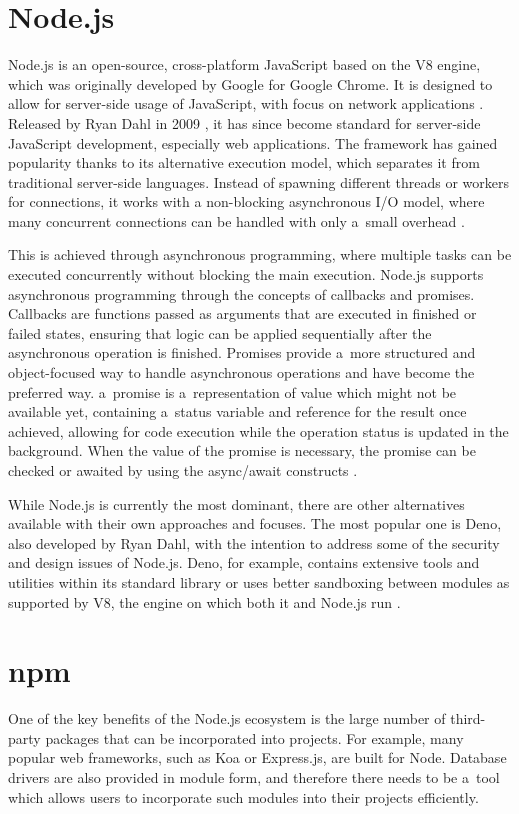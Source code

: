 \section*{Node.js}
Node.js is an open-source, cross-platform JavaScript based on the V8 engine,
which was originally developed by Google for Google Chrome. It is designed to
allow for server-side usage of JavaScript, with focus on network applications
\cite{node-about}. Released by Ryan Dahl in 2009 \cite{ryan-node}, it has since
become standard for server-side JavaScript development, especially web
applications. The framework has gained popularity thanks to its alternative
execution model, which separates it from traditional server-side languages.
Instead of spawning different threads or workers for connections, it works with
a non-blocking asynchronous I/O model, where many concurrent connections can be
handled with only a~small overhead \cite{orsini_2013}.

This is achieved through asynchronous programming, where multiple tasks can be
executed concurrently without blocking the main execution. Node.js supports
asynchronous programming through the concepts of callbacks and promises.
Callbacks are functions passed as arguments that are executed in finished or
failed states, ensuring that logic can be applied sequentially after the
asynchronous operation is finished. Promises provide a~more structured and
object-focused way to handle asynchronous operations and have become the
preferred way. a~promise is a~representation of value which might not be
available yet, containing a~status variable and reference for the result once
achieved, allowing for code execution while the operation status is updated in
the background. When the value of the promise is necessary, the promise can be
checked or awaited by using the async/await constructs
\cite{PromiseJavaScriptMDN_2023}.

While Node.js is currently the most dominant, there are other alternatives
available with their own approaches and focuses. The most popular one is Deno,
also developed by Ryan Dahl, with the intention to address some of the security
and design issues of Node.js. Deno, for example, contains extensive tools and
utilities within its standard library or uses better sandboxing between modules
as supported by V8, the engine on which both it and Node.js run \cite{Deno}.

\section*{npm}
One of the key benefits of the Node.js ecosystem is the large number of
third-party packages that can be incorporated into projects. For example, many
popular web frameworks, such as Koa or Express.js, are built for Node. Database
drivers are also provided in module form, and therefore there needs to be a~tool
which allows users to incorporate such modules into their projects efficiently. 

